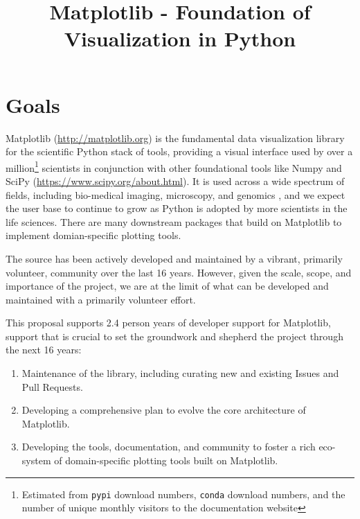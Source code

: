 \documentclass[11pt]{article}  %
\begin{document}
\title{Matplotlib - Foundation of Visualization in Python}
\author{}
\maketitle

\section{Goals}

Matplotlib (\url{http://matplotlib.org}) is the fundamental data
visualization library for the scientific Python stack of tools,
providing a visual interface used by over a million\footnote{Estimated
from \texttt{pypi} download numbers, \texttt{conda} download numbers,
and the number of unique monthly visitors to the documentation
website} scientists in conjunction with other foundational tools like
Numpy and SciPy (\url{https://www.scipy.org/about.html}).  It is used
across a wide spectrum of fields, including bio-medical imaging,
microscopy, and genomics
\cite{Carpenter2006,Wolf2018,10.7717/peerj.453}
\cite{Segata2011,10.1371/journal.pgen.1000695,HASHIMSHONY2012666,
  10.1093/bioinformatics/bts480,Carlile2014,Laganowsky2014,Jiangaac9462,
  10.3389/fninf.2014.00014}, and we expect the user base to continue
to grow as Python is adopted by more scientists in the life
sciences. There are many downstream packages that build on Matplotlib
to implement domian-specific plotting tools.

The source has been actively developed and maintained by a vibrant,
primarily volunteer, community over the last 16 years.  However, given
the scale, scope, and importance of the project, we are at the limit
of what can be developed and maintained with a primarily volunteer
effort.

This proposal supports 2.4 person years of developer support for
Matplotlib, support that is crucial to set the groundwork and shepherd
the project through the next 16 years:

\begin{enumerate}[label=\alph*),noitemsep]
  \item Maintenance of the library, including curating new and
    existing Issues and Pull Requests.
  \item Developing a comprehensive plan to evolve the core architecture
    of Matplotlib.
  \item Developing the tools, documentation, and community to foster a
    rich eco-system of domain-specific plotting tools built on
    Matplotlib.
\end{enumerate}
\end{document}
